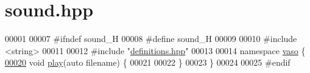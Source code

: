 \hypertarget{sound_8hpp_source}{\section{sound.\+hpp}
\label{sound_8hpp_source}
}

\begin{DoxyCode}
00001 
00007 \textcolor{preprocessor}{#ifndef sound\_H}
00008 \textcolor{preprocessor}{#define sound\_H}
00009 
00010 \textcolor{preprocessor}{#include <string>}
00011 
00012 \textcolor{preprocessor}{#include "\hyperlink{definitions_8hpp}{definitions.hpp}"}
00013 
00014 \textcolor{keyword}{namespace }\hyperlink{namespacevaso}{vaso} \{
\hypertarget{sound_8hpp_source_l00020}{}\hyperlink{namespacevaso_a7da499b9b1b5a492bea8ab8681e57c22}{00020}     \textcolor{keywordtype}{void} \hyperlink{namespacevaso_a7da499b9b1b5a492bea8ab8681e57c22}{play}(\textcolor{keyword}{auto} filename) \{
00021 
00022     \}
00023 \}
00024 
00025 \textcolor{preprocessor}{#endif}
\end{DoxyCode}

